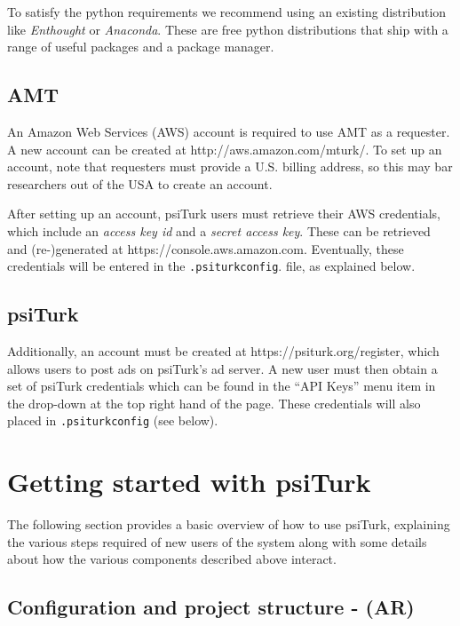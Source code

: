 \documentclass[twocolumn]{svjour3}          %
\begin{document}
To satisfy the python requirements we recommend using an existing distribution like \emph{Enthought} or \emph{Anaconda}. These are free
python distributions that ship with a range of useful packages and a package manager. 

\subsection{AMT}
An Amazon Web Services (AWS) account is required to use AMT as a requester. A new account can be created at \textsf{http://aws.amazon.com/mturk/}. 
To set up an account, note that requesters
must provide a U.S. billing address, so this may bar researchers out of the USA to create an account. 

After setting up an account, psiTurk users must retrieve their AWS credentials, which include an \emph{access key id} and a
\emph{secret access key}. These can be retrieved and (re-)generated at \textsf{https://console.aws.amazon.com}.
Eventually, these credentials will be entered in the \texttt{.psiturkconfig}. file, as explained below.


\subsection{psiTurk}
Additionally, an account must be created at \textsf{https://psiturk.org/register}, which allows users to 
post ads on psiTurk's ad server. A new user must then obtain a set of psiTurk credentials which can be found in 
the ``API Keys'' menu item in the drop-down at the top right hand of the page.
These credentials will also placed in \texttt{.psiturkconfig} (see below).




\section{Getting started with \textsf{psiTurk}}

The following section provides a basic overview of how to use psiTurk,
explaining the various steps required of new users of the system along with
some details about how the various components described above interact.

\subsection{Configuration and project structure - (AR)}
\end{document}
